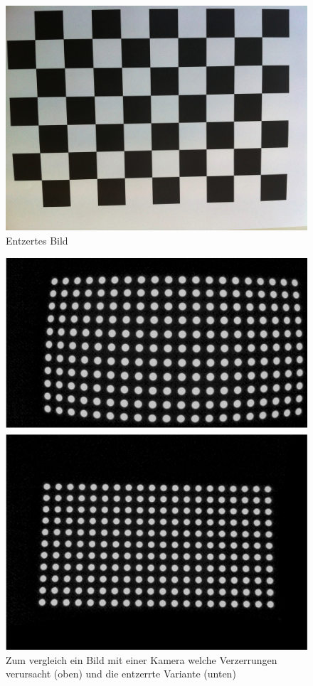 \begin{figure}[!ht]
\centering
\includegraphics[scale=0.1]{images/chessboard-undisorted.jpg} 
\caption{Entzertes Bild}
\label{fig:chessboard-undisorted}
\end{figure}

\begin{figure}[!ht]
\centering
\includegraphics[scale=0.7]{images/calibration.jpg} 
\caption{Zum vergleich ein Bild mit einer Kamera welche Verzerrungen verursacht (oben) und die entzerrte Variante (unten)}
\label{fig:calibration}
\end{figure}

